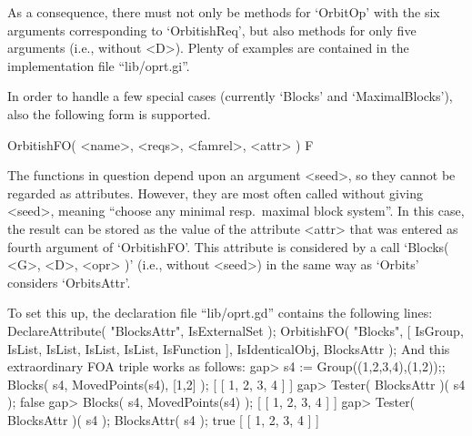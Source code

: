 As a  consequence, there must not only be methods for `OrbitOp' with
the six arguments corresponding to `OrbitishReq',
but also methods for only five arguments (i.e., without <D>).
Plenty of examples are contained in the implementation file ``lib/oprt.gi''.

In order to handle a few special cases
(currently `Blocks' and `MaximalBlocks'),
also the following form is supported.

\)OrbitishFO( <name>, <reqs>, <famrel>, <attr> ) F

The functions in question depend upon an argument <seed>,
so they cannot be regarded as attributes.
However, they are most often called without giving <seed>,
meaning ``choose any minimal resp.\ maximal block system''.
In this case, the result can be stored as the value of the attribute
<attr> that was entered as fourth argument of `OrbitishFO'.
This attribute is considered by a call `Blocks( <G>, <D>, <opr> )'
(i.e., without <seed>) in the same way as `Orbits' considers  `OrbitsAttr'.

To set this up, the declaration file ``lib/oprt.gd'' contains the following
lines:
\begintt
DeclareAttribute( "BlocksAttr", IsExternalSet );
OrbitishFO( "Blocks",
    [ IsGroup, IsList, IsList,
      IsList,
      IsList,
      IsFunction ], IsIdenticalObj, BlocksAttr );
\endtt
And this extraordinary FOA triple works as follows:
\beginexample
gap> s4 := Group((1,2,3,4),(1,2));; Blocks( s4, MovedPoints(s4), [1,2] );
[ [ 1, 2, 3, 4 ] ]
gap> Tester( BlocksAttr )( s4 );
false
\endexample
\beginexample
gap> Blocks( s4, MovedPoints(s4) );       
[ [ 1, 2, 3, 4 ] ]
gap> Tester( BlocksAttr )( s4 );  BlocksAttr( s4 );
true
[ [ 1, 2, 3, 4 ] ]
\endexample



